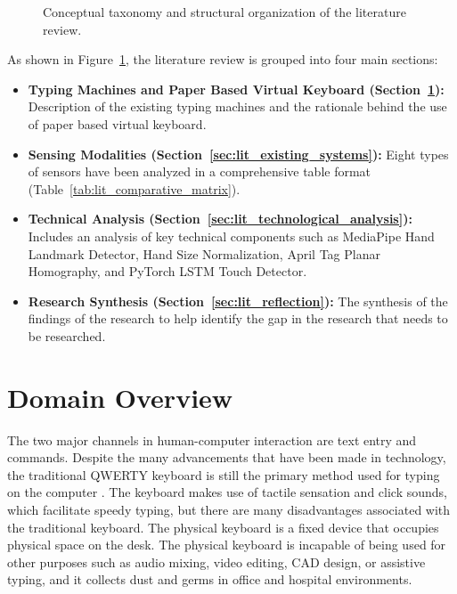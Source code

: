 \begin{figure}[htbp]
{%
}
\caption{Conceptual taxonomy and structural organization of the literature review.}
\label{fig:lit_conceptual_map_diagram}
\end{figure}

As shown in Figure~\ref{fig:lit_conceptual_map_diagram}, the literature review is grouped into four main sections:
\begin{itemize}
    \item \textbf{Typing Machines and Paper Based Virtual Keyboard (Section~\ref{sec:lit_domain_overview}):} Description of the existing typing machines and the rationale behind the use of paper based virtual keyboard.
    \item \textbf{Sensing Modalities (Section~\ref{sec:lit_existing_systems}):} Eight types of sensors have been analyzed in a comprehensive table format (Table~\ref{tab:lit_comparative_matrix}).
    \item \textbf{Technical Analysis (Section~\ref{sec:lit_technological_analysis}):} Includes an analysis of key technical components such as MediaPipe Hand Landmark Detector, Hand Size Normalization, April Tag Planar Homography, and PyTorch LSTM Touch Detector.
    \item \textbf{Research Synthesis (Section~\ref{sec:lit_reflection}):} The synthesis of the findings of the research to help identify the gap in the research that needs to be researched.
\end{itemize}

\section{Domain Overview}
\label{sec:lit_domain_overview}
The two major channels in human-computer interaction are text entry and commands. Despite the many advancements that have been made in technology, the traditional QWERTY keyboard is still the primary method used for typing on the computer \cite{ReviewVirtualKeyboard2020}. The keyboard makes use of tactile sensation and click sounds, which facilitate speedy typing, but there are many disadvantages associated with the traditional keyboard. The physical keyboard is a fixed device that occupies physical space on the desk. The physical keyboard is incapable of being used for other purposes such as audio mixing, video editing, CAD design, or assistive typing, and it collects dust and germs in office and hospital environments.


